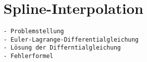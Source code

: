 %
%
%
\section{Spline-Interpolation
\label{buch:variation:section:splines}}

\begin{verbatim}
- Problemstellung
- Euler-Lagrange-Differentialgleichung
- Lösung der Differntialgleichung
- Fehlerformel
\end{verbatim}
